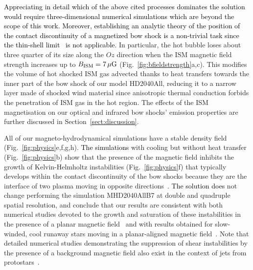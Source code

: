 \documentclass[useAMS,usenatbib]{mn2e}
\begin{document}
\textcolor{black}{
Appreciating in detail which of the above cited processes dominates the solution would 
require three-dimensional numerical simulations which are beyond the scope of this work. 
Moreover, establishing an analytic theory of the position of the contact 
discontinuity of a magnetized bow shock is a non-trivial task since the 
thin-shell limit~\citep{wilkin_459_apj_1996} is not applicable. 
}
%
In particular, the hot bubble loses about three quarter of its size along
the $Oz$ direction when the ISM magnetic field strength increases up to $B_{\rm
ISM}=7\, \mu \rm G$ (Fig.~\ref{fig:bfieldstrength}a,c). This modifies 
the volume of hot shocked ISM gas advected thanks to heat transfers towards the
inner part of the bow shock of our model HD2040All, reducing it to a narrow
layer made of shocked wind material since anisotropic thermal conduction forbids
the penetration of ISM gas in the hot region. The effects of the ISM
magnetisation on our optical and infrared bow shocks' emission properties are 
further discussed in Section~\ref{sect:discussion}. 





All of our magneto-hydrodynamical simulations have a stable density field
(Fig.~\ref{fig:physics}e,f,g,h). \textcolor{black}{The simulations} with cooling but
without heat transfer (Fig.~\ref{fig:physics}b) show that the presence of the
magnetic field inhibits the growth of Kelvin-Helmholtz instabilities
(Fig.~\ref{fig:physics}f) that typically develops within the contact
discontinuity of the bow shocks because they are the interface of two plasma
moving in opposite
directions~\citep[][Paper~I]{comeron_aa_338_1998,vanmarle_aa_469_2007}. 
\textcolor{black}{The solution does} not change performing the simulation MHD2040AllB7 at double and
quadruple spatial resolution, and conclude that our results are consistent with both
numerical studies devoted to the growth and saturation of these instabilities in
the presence of a planar magnetic field~\citep[see,
e.g.][]{keppens_jplph_61_1999} and with results obtained for slow-winded, cool
runaway stars moving in a planar-aligned magnetic
field~\citep{vanmarle_aa_561_2014}. Note that detailed numerical studies
demonstrating the suppression of shear instabilities by the presence of a
background magnetic field also exist in the context of jets from
protostars~\citep{viallet_473_aa_2007}.
\end{document}
